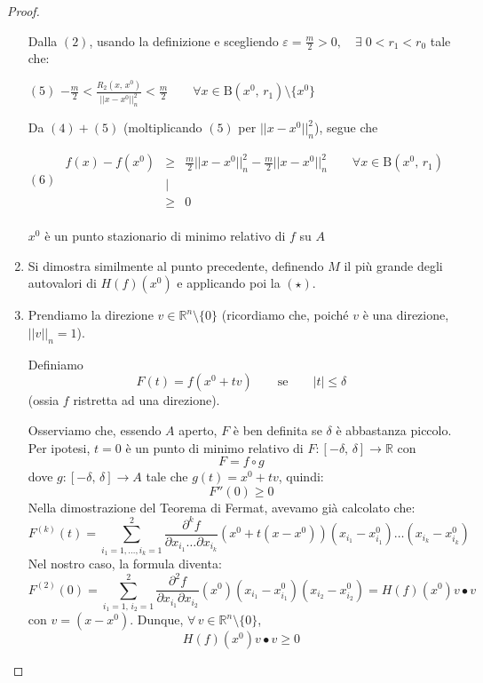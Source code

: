 \begin{proof}
\begin{enumerate}[labelindent=\parindent,leftmargin=*,label=\textnormal{(\roman*)},start=1]
Dalla $\mathrm{(2)}$, usando la definizione e scegliendo $\varepsilon = \frac{m}{2} > 0, \quad \exists \; 0 < r_1 < r_0$ tale che:
\begin{center}
$\mathrm{(5)}$
\hfill
$\displaystyle
-\frac{m}{2} < \frac{R_2(x,\,x^0)}{||x-x^0||_n^2} < \frac{m}{2} \qquad \forall x \in \mathrm{B}(x^0,\,r_1) \setminus \lbrace x^0 \rbrace
$
\hfill \null \\
\end{center}
Da $\mathrm{(4)} + \mathrm{(5)}$ (moltiplicando $\mathrm{(5)}$ per $||x-x^0||_n^2$), segue che
\begin{center}
$\mathrm{(6)}$
\hfill
$\displaystyle
\begin{array}{rcl}
f(x) - f(x^0) & \geq & \frac{m}{2}||x-x^0||_n^2 - \frac{m}{2}||x-x^0||_n^2 \qquad \forall x \in \mathrm{B}(x^0,\,r_1)\\ 
& \big\lvert & \\
& \geq & 0
\end{array}
$
\hfill \null \\
 \\
$x^0$ è un punto stazionario di minimo relativo di $f$ su $A$
\end{center}

\item Si dimostra similmente al punto precedente, definendo $M$ il più grande degli autovalori di $H(f)(x^0)$ e applicando poi la $\mathrm{(\star)}$.

\item Prendiamo la direzione $v \in \mathbb{R}^n \setminus \lbrace 0 \rbrace$ (ricordiamo che, poiché $v$ è una direzione, $||v||_n = 1$).
\begin{center}
\def\svgwidth{8cm}

\end{center}
Definiamo
$$
F(t) = f(x^0 + tv) \qquad \text{se} \qquad |t| \leq \delta
$$
(ossia $f$ ristretta ad una direzione).

Osserviamo che, essendo $A$ aperto, $F$ è ben definita se $\delta$ è abbastanza piccolo. Per ipotesi, $t = 0$ è un punto di minimo relativo di $F : [-\delta,\,\delta] \longrightarrow \mathbb{R}$ con
$$
F = f \circ g
$$
dove $g : [-\delta,\,\delta] \longrightarrow A$ tale che $g(t) = x^0 + tv$, quindi:
$$
F''(0) \geq 0
$$
Nella dimostrazione del Teorema di Fermat, avevamo già calcolato che:
$$
F^{(k)}(t) = 
\sum_{i_1=1,\ldots,i_k=1}^2
\frac{\partial^k f}{\partial x_{i_1} \ldots \partial x_{i_k}}(x^0+t(x-x^0))
(x_{i_1}-x_{i_1}^0) \ldots (x_{i_k}-x_{i_k}^0)
$$
Nel nostro caso, la formula diventa:
$$
F^{(2)}(0) = 
\sum_{i_1=1,\,i_2=1}^2
\frac{\partial^2 f}{\partial x_{i_1} \partial x_{i_2}}(x^0)
(x_{i_1}-x_{i_1}^0)(x_{i_2}-x_{i_2}^0) =
H(f)(x^0)v \bullet v
$$
con $v = (x-x^0)$. Dunque, $\forall \, v \in \mathbb{R}^n \setminus \lbrace 0 \rbrace$,
$$
H(f)(x^0)v \bullet v \geq 0
$$
\end{enumerate}
\end{proof}


